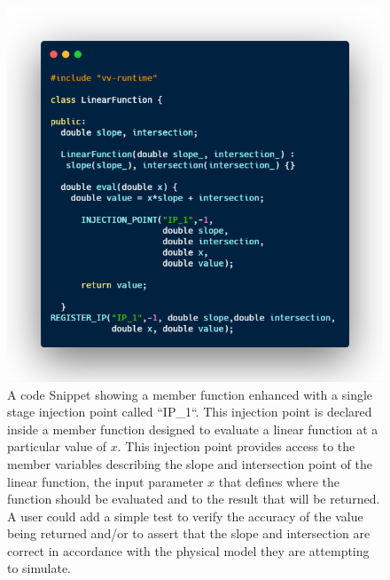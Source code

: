\begin{figure}
 \includegraphics[width=\textwidth]{./Figures/linear-func.png}
 \caption{A code Snippet showing a member function enhanced with a single stage injection point called ``IP\_1``. This injection point is declared inside a member function 
 designed to evaluate a linear function at a particular value of $x$. This injection point provides access to the member variables describing the slope and intersection point
 of the linear function, the input parameter $x$ that defines where the function should be evaluated and to the result that will be returned. A user could add a simple test to 
 verify the accuracy of the value being returned and/or to assert that the slope and intersection are correct in accordance with the physical model they are attempting to simulate. 
 \label{ip_example}}
\end{figure}


